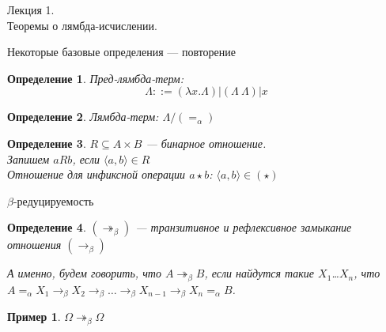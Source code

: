\documentclass[aspectratio=169]{beamer}
\begin{document}
\newtheorem{dfn}{Определение}[section]
\newtheorem{nte}{Замечание}[section]

\newtheorem{axiom}{Аксиома}[section]
\newtheorem{thm}{Теорема}[section]
\newtheorem{lmm}[theorem]{Лемма}
\newtheorem{statement}{Утверждение}[section]
\newtheorem{oun_paragraph}{Пункт}[section]
\newtheorem{cons}{Следствие}[section]
\newtheorem*{exm}{Пример}

\newcommand{\comb}[1]{\operatorname{\bf{\textrm{#1}}}}
\newcommand{\func}[1]{\operatorname{#1}}
\newcommand{\reduction}[1]{{\color{OrangeRed}#1}}
\newcommand{\set}[1]{\left\{#1\right\}}

\def\from#1{\par \parbox{0.7\textwidth}{\par \hfill\raggedleft \it #1}} 

\begin{frame}{}
\begin{center}\Large Лекция 1.\\ \Large Теоремы о лямбда-исчислении.\end{center}
\end{frame}

\begin{frame}{Некоторые базовые определения --- повторение}
\begin{dfn}Пред-лямбда-терм:
$$\Lambda ::= (\lambda x.\Lambda) | (\Lambda\ \Lambda) | x$$
\end{dfn}
\begin{dfn}Лямбда-терм: $\Lambda/(=_\alpha)$
\end{dfn}

\begin{dfn}$R \subseteq A \times B$ --- бинарное отношение.\\
Запишем $aRb$, если $\langle a, b \rangle \in R$\\
Отношение для инфиксной операции $a \star b$: $\langle a,b \rangle \in (\star)$
\end{dfn}
\end{frame}

\begin{frame}{$\beta$-редуцируемость}
\begin{dfn}
	$(\twoheadrightarrow_\beta)$ --- транзитивное и рефлексивное замыкание отношения $(\rightarrow_\beta)$

	А именно, будем говорить, что $A\twoheadrightarrow_{\beta}B$, если найдутся такие $X_{1}$\ldots $X_{n}$, что $A=_{\alpha}X_{1}\to_{\beta}X_{2}\to_{\beta}\ldots\to_{\beta}X_{n-1}\to_{\beta}X_{n}=_{\alpha}B$.
\end{dfn}

\begin{exm}
	$\Omega\twoheadrightarrow_{\beta}\Omega$
\end{exm}
\end{frame}
\end{document}
